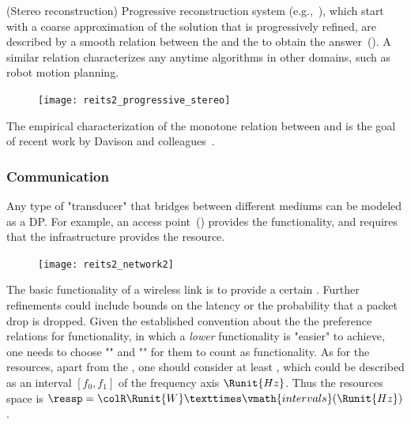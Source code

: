 \begin{example}
(Stereo reconstruction) Progressive reconstruction system (e.g.,~\cite{locher16progressive}),
which start with a coarse approximation of the solution that is progressively
refined, are described by a smooth relation between the 
and the  to obtain the answer~().
A similar relation characterizes any anytime algorithms in other domains,
such as robot motion planning.
\end{example}

\begin{figure}[h]
    \centering
    \texttt{[image: reits2\_progressive\_stereo]}
    \caption{\label{fig:progressive}}
\end{figure}


\begin{example}
The empirical characterization of the monotone relation between  and 
is the goal of recent work by Davison and colleagues~\cite{nardi15introducing,zia16comparative}.
\end{example}



\subsubsection{Communication}

\begin{example}[Transducers]
Any type of "transducer" that bridges between different
mediums can be modeled as a DP. For example, an access point~()
provides the  functionality, and requires
that the infrastructure provides the  resource.
\end{example}

\begin{figure}[h] 
    \centering
    \texttt{[image: reits2\_network2]}
    \caption{\label{fig:accesspoint}}

\end{figure}

\begin{example}
The basic functionality of a wireless link is to provide
a certain . Further refinements could include bounds
on the latency or the probability that a packet drop is dropped. Given
the established convention about the the preference relations for
functionality, in which a \emph{lower} functionality is "easier"
to achieve, one needs to choose ""
and "" for them
to count as functionality. As for the resources, apart from the , one should consider at least ,
which could be described as an interval $[f_0,f_1]$ of the frequency
axis $\Runit{Hz}$. Thus the resources space is $\ressp=\colR\Runit{W}×\vmath{intervals}(\Runit{Hz})$.
\end{example}

